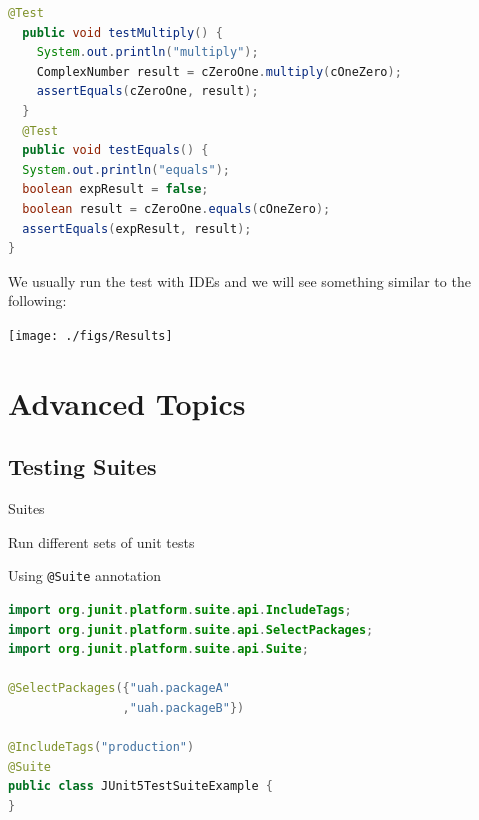 \documentclass[11pt, xcolor=svgnames]{beamer}
\begin{document}
\begin{frame}[fragile]

\begin{lstlisting}[language=Java,basicstyle=\tiny]
  @Test
  public void testMultiply() {
    System.out.println("multiply");
    ComplexNumber result = cZeroOne.multiply(cOneZero);
    assertEquals(cZeroOne, result);
  }
  @Test
  public void testEquals() {
  System.out.println("equals");
  boolean expResult = false;
  boolean result = cZeroOne.equals(cOneZero);
  assertEquals(expResult, result);
}
\end{lstlisting}


\end{frame}


\begin{frame}

We usually run the test with IDEs and we will see something similar to the following:

\begin{center}
\texttt{[image: ./figs/Results]}
\end{center}

\end{frame}


\section{Advanced Topics}


\subsection{Testing Suites}


\begin{frame}[fragile]{Suites}

Run different sets of unit tests

Using \texttt{@Suite} annotation

\begin{lstlisting}[language=Java,basicstyle=\scriptsize]  
import org.junit.platform.suite.api.IncludeTags;
import org.junit.platform.suite.api.SelectPackages;
import org.junit.platform.suite.api.Suite;

@SelectPackages({"uah.packageA"
                ,"uah.packageB"})

@IncludeTags("production")
@Suite
public class JUnit5TestSuiteExample {
}
\end{lstlisting}

\end{frame}
\end{document}
